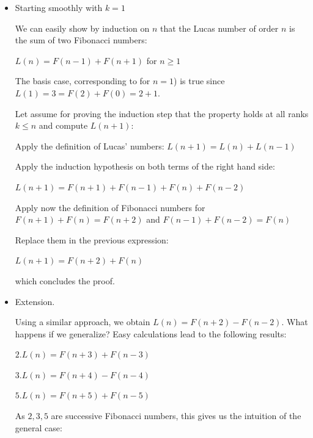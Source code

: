 \begin{itemize}
\item Starting smoothly with $k=1$

We can easily show by induction on $n$ that the Lucas number of order $n$ is the sum of two Fibonacci numbers:

$L(n) = F(n-1)+F(n+1)$ for $n \geq 1$
\medskip

%
%
%
%
%

The basis case, corresponding to for $n=1$) is true since $L(1) = 3 = F(2) + F(0) = 2+1$.

Let assume for proving the induction step that the property holds at all ranks $k \leq n$ and compute $L(n+1)$:

Apply the definition of Lucas' numbers: $L(n+1) = L(n)+L(n-1)$

Apply the induction hypothesis on both terms of the right hand side:

 $L(n+1) = F(n+1)+F(n-1)+F(n)+F(n-2)$

Apply now the definition of Fibonacci numbers for $F(n+1) + F(n) = F(n+2)$  and $F(n-1) + F(n-2) = F(n)$

Replace them in the previous expression:

$L(n+1) = F(n+2)+F(n)$

which concludes the proof.

\item
Extension.

Using a similar approach, we obtain $L(n) = F(n+2)-F(n-2)$. 
What happens if we generalize? Easy calculations lead to the following results:
\medskip

$2.L(n) = F(n+3) + F(n-3) $

%
%
%
%
%
%
%
%
%
%
%

$3.L(n) = F(n+4) - F(n-4)$

$5.L(n) = F(n+5) + F(n-5)$
\medskip
 
As $2, 3, 5$ are successive Fibonacci numbers, this gives us the intuition of the general case:


\end{itemize}
